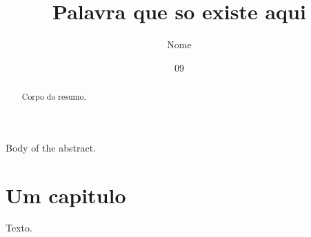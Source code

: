 \documentclass[grad]{ufrj}
\title{Palavra que so existe aqui}
\author{Nome}{Sobrenome}
\date{09}{2026}
\begin{document}
  \maketitle
  \frontmatter
  \begin{abstract}Corpo do resumo.\end{abstract}
  \begin{foreignabstract}Body of the abstract.\end{foreignabstract}
  \tableofcontents
  \mainmatter
  \chapter{Um capitulo}
  Texto.
\end{document}
